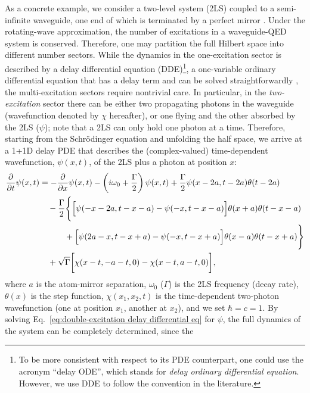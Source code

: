 \documentclass[final,1p,times]{elsarticle}
\begin{document}
As a concrete example, we consider a two-level system (2LS) coupled to a semi-infinite waveguide, one end of which is terminated by a perfect mirror \cite{FangPRA15, FangNJP18}. 
Under the rotating-wave approximation, the number of excitations in a waveguide-QED system is conserved. Therefore, one may partition the full Hilbert space into different number sectors. While the dynamics in the one-excitation sector is described by a delay differential equation (DDE)\footnote{To be more consistent with respect to its PDE counterpart, one could use the acronym ``delay ODE'', which stands for \emph{delay ordinary differential equation}. However, we use DDE to follow the convention in the literature.}, a one-variable ordinary differential equation that has a delay term \cite{FangNJP18, TufarelliPRA13, DornerPRA02} and can be solved straightforwardly \cite{DDEbook}, the multi-excitation sectors require nontrivial care. In particular, in the \emph{two-excitation} sector there can be either two propagating photons in the waveguide (wavefunction denoted by $\chi$ hereafter), or one flying and the other absorbed by the 2LS ($\psi$); note that a 2LS can only hold one photon at a time.
Therefore, starting from the Schr\"{o}dinger equation and unfolding the half space, we arrive at
a 1+1D delay PDE that describes the (complex-valued) time-dependent wavefunction, $\psi(x,t)$, of the 2LS plus a photon at position $x$:
\begin{equation}
\begin{aligned}
\frac{\partial}{\partial t}\psi(x,t)&=-\frac{\partial}{\partial x}\psi(x,t)-\left(i\omega_0+\frac{\Gamma}{2}\right)\psi(x,t)+\frac{\Gamma}{2}\psi(x-2a, t-2a)\theta(t-2a)  \\
&\quad- \frac{\Gamma}{2}\Biggl\{\Bigl[\psi(- x- 2a, t- x- a) - \psi(- x, t- x- a)\Bigr]\theta(x+a)\theta(t- x- a)\\
&\quad\quad\quad +\Bigl[\psi(2a- x, t- x+ a)- \psi(- x, t- x+a)\Bigr]\theta(x- a)\theta(t- x+ a)\Biggr\} \\
&\quad+\sqrt{\Gamma}\biggl[\chi(x-t,-a-t,0)-\chi(x-t,a-t,0)\biggr],
\end{aligned}\label{eq:double-excitation delay differential eq}
\end{equation}
where $a$ is the atom-mirror separation, $\omega_0$ ($\Gamma$) is the 2LS frequency (decay rate), $\theta(x)$ is the step function, $\chi(x_1, x_2,t )$ is the time-dependent two-photon wavefunction (one at position $x_1$, another at $x_2$), and we set $\hbar=c=1$. By solving Eq.~\eqref{eq:double-excitation delay differential eq} for $\psi$, the full dynamics of the system can be completely determined, since the
\end{document}
